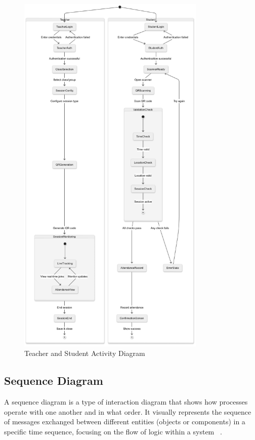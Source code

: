 \documentclass[12pt,a4paper]{report}
\begin{document}
\begin{figure}[htbp]
    \centering
    \includegraphics[width=0.8\textwidth]{images/morsli/Activity2.png}
    \caption{Teacher and Student Activity Diagram}
    \label{fig:attendance-system}
\end{figure}




\newpage
\subsection{Sequence Diagram}

A sequence diagram is a type of interaction diagram that shows how processes operate with one another and in what order. It visually represents the sequence of messages exchanged between different entities (objects or components) in a specific time sequence, focusing on the flow of logic within a system~\cite{booch2005uml}
.
\end{document}
